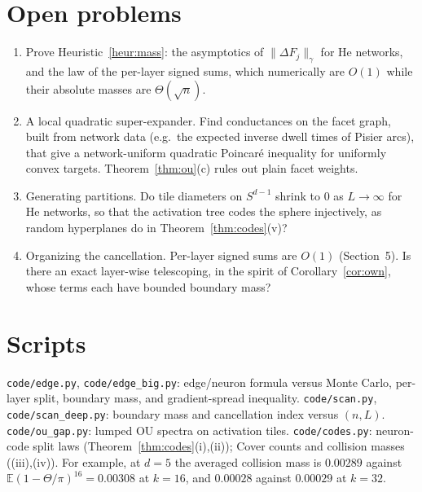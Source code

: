 \documentclass[11pt]{article}
\theoremstyle{definition}
\theoremstyle{remark}
\newcommand{\E}{\mathbb E}
\begin{document}
\section{Open problems}
\begin{enumerate}
\item Prove Heuristic~\ref{heur:mass}: the asymptotics of $\|\Delta F_j\|_\gamma$ for He networks, and the law of the per-layer signed sums, which numerically are $O(1)$ while their absolute masses are $\Theta(\sqrt n)$.
\item A local quadratic super-expander. Find conductances on the facet graph, built from network data (e.g.\ the expected inverse dwell times of Pisier arcs), that give a network-uniform quadratic Poincar\'e inequality for uniformly convex targets. Theorem~\ref{thm:ou}(c) rules out plain facet weights.
\item Generating partitions. Do tile diameters on $S^{d-1}$ shrink to $0$ as $L\to\infty$ for He networks, so that the activation tree codes the sphere injectively, as random hyperplanes do in Theorem~\ref{thm:codes}(v)?
\item Organizing the cancellation. Per-layer signed sums are $O(1)$ (Section~5). Is there an exact layer-wise telescoping, in the spirit of Corollary~\ref{cor:own}, whose terms each have bounded boundary mass?
\end{enumerate}

\appendix
\section{Scripts}
\texttt{code/edge.py}, \texttt{code/edge\_big.py}: edge/neuron formula versus Monte Carlo, per-layer split, boundary mass, and gradient-spread inequality. \texttt{code/scan.py}, \texttt{code/scan\_deep.py}: boundary mass and cancellation index versus $(n,L)$. \texttt{code/ou\_gap.py}: lumped OU spectra on activation tiles. \texttt{code/codes.py}: neuron-code split laws (Theorem~\ref{thm:codes}(i),(ii)); Cover counts and collision masses ((iii),(iv)). For example, at $d=5$ the averaged collision mass is $0.00289$ against $\E(1-\Theta/\pi)^{16}=0.00308$ at $k=16$, and $0.00028$ against $0.00029$ at $k=32$.
\end{document}
